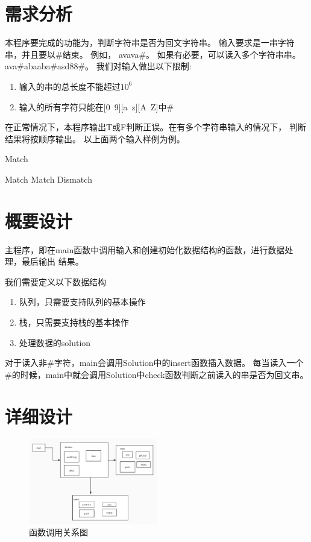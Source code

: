 \section{需求分析}

本程序要完成的功能为，判断字符串是否为回文字符串。
输入要求是一串字符串，并且要以\#结束。
例如，
avava\#。
如果有必要，可以读入多个字符串串。
ava\#abaaba\#asd88\#。
我们对输入做出以下限制:
\begin{enumerate}
   \item 输入的串的总长度不能超过$10^6$
   \item 输入的所有字符只能在[0~9][a~z][A~Z]中\#
\end{enumerate}


在正常情况下，本程序输出T或F判断正误。在有多个字符串输入的情况下，
判断结果将按顺序输出。
以上面两个输入样例为例。

Match


Match Match Dismatch



\section{概要设计}
   主程序，即在main函数中调用输入和创建初始化数据结构的函数，进行数据处理，最后输出
   结果。


   我们需要定义以下数据结构
   \begin{enumerate}
      \item 队列，只需要支持队列的基本操作
      \item 栈，只需要支持栈的基本操作
      \item 处理数据的solution
   \end{enumerate}


   对于读入非\#字符，main会调用Solution中的insert函数插入数据。
   每当读入一个\#的时候，main中就会调用Solution中check函数判断之前读入的串是否为回文串。

\newpage

\section{详细设计}
   \begin{figure}[H]
      \centering
      \includegraphics[width=0.5\textwidth]{images/process.jpg}
      \caption{函数调用关系图}
   \end{figure}


